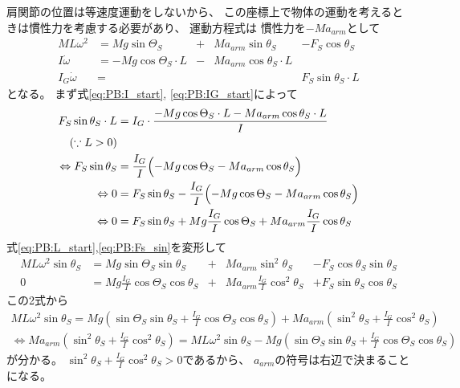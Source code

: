 \documentclass[a4paper,11pt]{jsarticle}
\begin{document}
肩関節の位置は等速度運動をしないから、
この座標上で物体の運動を考えるときは慣性力を考慮する必要があり、
運動方程式は
慣性力を$-Ma_{arm}$として
\begin{align}
  ML\omega^2 &= Mg\sin\Theta_S &+& Ma_{arm}\sin\theta_S &- F_S\cos\theta_S
  \label{eq:PB:L_start}
  \\
  I\dot\omega &= -Mg\cos\Theta_S \cdot L &-& Ma_{arm}\cos\theta_S \cdot L &
  \label{eq:PB:I_start}
  \\
  I_G\dot\omega &= & & & F_S \sin\theta_S \cdot L
  \label{eq:PB:IG_start}
\end{align}
となる。
まず式\ref{eq:PB:I_start}, \ref{eq:PB:IG_start}によって
\begin{align}
  F_S\sin\theta_S \cdot L 
  & = I_G \cdot \frac{-Mg\cos\Theta_S \cdot L - Ma_{arm}\cos\theta_S \cdot L}{I}
  \\
  \left( \because L > 0 \right) &
  \\
  \Leftrightarrow
  F_S\sin\theta_S
  & = \frac{I_G}{I}\Bigl( -Mg\cos\Theta_S - Ma_{arm}\cos\theta_S \Bigr)
  \\
  \Leftrightarrow
  0
  & = F_S\sin\theta_S - \frac{I_G}{I}\Bigl( -Mg\cos\Theta_S - Ma_{arm}\cos\theta_S \Bigr)
  \\
  \Leftrightarrow
  0
  & = F_S\sin\theta_S + Mg\frac{I_G}{I}\cos\Theta_S + Ma_{arm}\frac{I_G}{I}\cos\theta_S
  \label{eq:PB:Fs_sin}
\end{align}
式\ref{eq:PB:L_start},\ref{eq:PB:Fs_sin}を変形して
\begin{align}
  ML\omega^2 \sin\theta_S &= Mg\sin\Theta_S \sin\theta_S
  &+& Ma_{arm}\sin^2\theta_S 
  &- F_S\cos\theta_S\sin\theta_S
  \\
  0
  &=  Mg\frac{I_G}{I}\cos\Theta_S\cos\theta_S 
  &+& Ma_{arm}\frac{I_G}{I}\cos^2\theta_S 
  &+ F_S\sin\theta_S\cos\theta_S
\end{align}
この2式から
\begin{align}
  ML\omega^2 \sin\theta_S
  = Mg\left( \sin\Theta_S \sin\theta_S + \frac{I_G}{I}\cos\Theta_S \cos\theta_S \right)
  + Ma_{arm}\left( \sin^2\theta_S + \frac{I_G}{I}\cos^2\theta_S \right)
\end{align}
\begin{align}
  \Leftrightarrow
  Ma_{arm}\left( \sin^2\theta_S + \frac{I_G}{I}\cos^2\theta_S \right)
  = ML\omega^2 \sin\theta_S
  - Mg\left( \sin\Theta_S \sin\theta_S + \frac{I_G}{I}\cos\Theta_S \cos\theta_S \right)
  \label{eq:PB:a_arm_end}
\end{align}
が分かる。
$\sin^2\theta_S + \frac{I_G}{I}\cos^2\theta_S > 0$であるから、
$a_{arm}$の符号は右辺で決まることになる。
\end{document}
